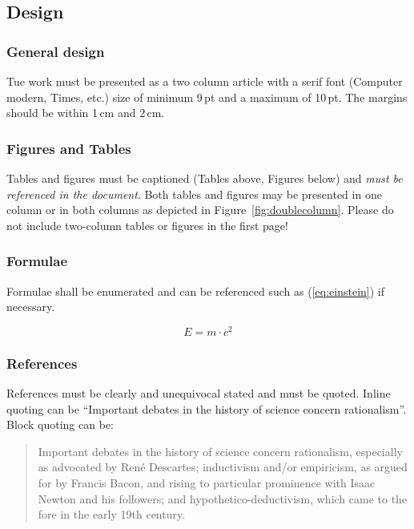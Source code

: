 	\subsection{Design}
	
	\subsubsection{General design}
	
	Tue work must be presented as a two column article with a serif font (Computer modern, Times, etc.)  size of minimum 9\,pt and a maximum of 10\,pt. The margins should be within 1\,cm and 2\,cm.
	
	\subsubsection{Figures and Tables}
	Tables and figures must be captioned (Tables above, Figures below) and \emph{must be referenced in the document}. Both tables and figures may be presented in one column or in both columns as depicted in Figure~\ref{fig:doublecolumn}. Please do not include two-column tables or figures in the first page!
	

	
	\subsubsection{Formulae}
	Formulae shall be enumerated and can be referenced such as (\ref{eq:einstein}) if necessary.
	
	\begin{equation}
		E=m\cdot c^2 \label{eq:einstein}
	\end{equation}
	
	\subsubsection{References}
	References must be clearly and unequivocal stated and must be quoted. Inline quoting can be ``Important debates in the history of science concern rationalism''\cite{scientificMethod}. Block quoting can be:
	\begin{quotation}
		Important debates in the history of science concern rationalism, especially as advocated by René Descartes; inductivism and/or empiricism, as argued for by Francis Bacon, and rising to particular prominence with Isaac Newton and his followers; and hypothetico-deductivism, which came to the fore in the early 19th century.\cite{scientificMethod}
	\end{quotation}
	
